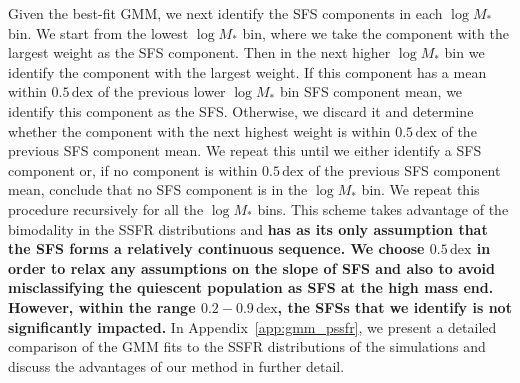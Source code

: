 \documentclass[tighten, preprint]{aastex62}
\begin{document}
Given the best-fit GMM, we next identify the SFS components in 
each $\log M_*$ bin. We start from the lowest $\log M_*$ bin, 
where we take the component with the largest weight as the SFS 
component. Then in the next higher $\log M_*$ bin we identify 
the component with the largest weight. If this component has a 
mean within $0.5\,\mathrm{dex}$ of the previous lower $\log M_*$ 
bin SFS component mean, we identify this component as the SFS. 
Otherwise, we discard it and determine whether the component with 
the next highest weight is within $0.5\,\mathrm{dex}$ of the 
previous SFS component mean. We repeat this until we either 
identify a SFS component or, if no component is within 
$0.5\,\mathrm{dex}$ of the previous SFS component mean, conclude 
that no SFS component is in the $\log M_*$ bin. We repeat this 
procedure recursively for all the $\log M_*$ bins. This scheme 
takes advantage  of the bimodality in the SSFR distributions and 
{\bf \color{red} has as its only assumption that the SFS forms a 
relatively continuous sequence. We choose $0.5\,\mathrm{dex}$ in order to relax 
any assumptions on the slope of SFS and also to avoid misclassifying 
the quiescent population as SFS at the high mass end. However, within 
the range $0.2 - 0.9\,\mathrm{dex}$, the SFSs that we identify is 
not significantly impacted.
}
In Appendix~\ref{app:gmm_pssfr}, we present a detailed comparison 
of the GMM fits to the SSFR distributions of the simulations 
and discuss the advantages of our method in further detail.



\end{document}
